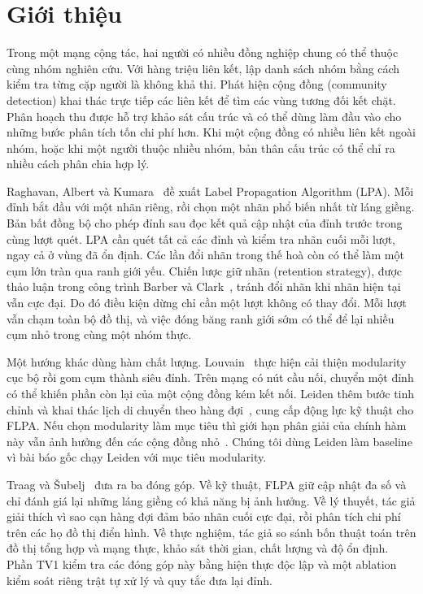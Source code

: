 \section{Giới thiệu}

Trong một mạng cộng tác, hai người có nhiều đồng nghiệp chung có thể thuộc cùng nhóm nghiên cứu. Với hàng triệu liên kết, lập danh sách nhóm bằng cách kiểm tra từng cặp người là không khả thi. Phát hiện cộng đồng (community detection) khai thác trực tiếp các liên kết để tìm các vùng tương đối kết chặt. Phân hoạch thu được hỗ trợ khảo sát cấu trúc và có thể dùng làm đầu vào cho những bước phân tích tốn chi phí hơn. Khi một cộng đồng có nhiều liên kết ngoài nhóm, hoặc khi một người thuộc nhiều nhóm, bản thân cấu trúc có thể chỉ ra nhiều cách phân chia hợp lý.

Raghavan, Albert và Kumara~\cite{raghavan} đề xuất Label Propagation Algorithm (LPA). Mỗi đỉnh bắt đầu với một nhãn riêng, rồi chọn một nhãn phổ biến nhất từ láng giềng. Bản bất đồng bộ cho phép đỉnh sau đọc kết quả cập nhật của đỉnh trước trong cùng lượt quét. LPA cần quét tất cả các đỉnh và kiểm tra nhãn cuối mỗi lượt, ngay cả ở vùng đã ổn định. Các lần đổi nhãn trong thế hoà còn có thể làm một cụm lớn tràn qua ranh giới yếu. Chiến lược giữ nhãn (retention strategy), được thảo luận trong công trình Barber và Clark~\cite{barber}, tránh đổi nhãn khi nhãn hiện tại vẫn cực đại. Do đó điều kiện dừng chỉ cần một lượt không có thay đổi. Mỗi lượt vẫn chạm toàn bộ đồ thị, và việc đóng băng ranh giới sớm có thể để lại nhiều cụm nhỏ trong cùng một nhóm thực.

Một hướng khác dùng hàm chất lượng. Louvain~\cite{blondel} thực hiện cải thiện modularity cục bộ rồi gom cụm thành siêu đỉnh. Trên mạng có nút cầu nối, chuyển một đỉnh có thể khiến phần còn lại của một cộng đồng kém kết nối. Leiden thêm bước tinh chỉnh và khai thác lịch di chuyển theo hàng đợi~\cite{leiden}, cung cấp động lực kỹ thuật cho FLPA. Nếu chọn modularity làm mục tiêu thì giới hạn phân giải của chính hàm này vẫn ảnh hưởng đến các cộng đồng nhỏ~\cite{fortunato}. Chúng tôi dùng Leiden làm baseline vì bài báo gốc chạy Leiden với mục tiêu modularity.

Traag và Šubelj~\cite{flpa} đưa ra ba đóng góp. Về kỹ thuật, FLPA giữ cập nhật đa số và chỉ đánh giá lại những láng giềng có khả năng bị ảnh hưởng. Về lý thuyết, tác giả giải thích vì sao cạn hàng đợi đảm bảo nhãn cuối cực đại, rồi phân tích chi phí trên các họ đồ thị điển hình. Về thực nghiệm, tác giả so sánh bốn thuật toán trên đồ thị tổng hợp và mạng thực, khảo sát thời gian, chất lượng và độ ổn định. Phần TV1 kiểm tra các đóng góp này bằng hiện thực độc lập và một ablation kiểm soát riêng trật tự xử lý và quy tắc đưa lại đỉnh.
